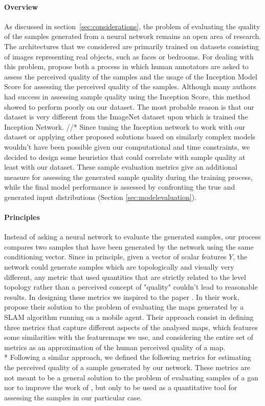\paragraph{Overview} As discussed in section~\ref{sec:considerations}, the problem of evaluating the quality of the samples generated from a neural network remains an open area of research. The architectures that we considered are primarily trained on datasets consisting of images representing real objects, such as faces or bedrooms. For dealing with this problem, \citeauthor{improved_gan} propose both a process in which human annotators are asked to assess the perceived quality of the samples \cite[p.~4]{improved_gan} and the usage of the Inception Model \cite{inception} Score for assessing the perceived quality of the samples. Although many authors had success in assessing sample quality using the Inception Score, this method showed to perform poorly on our dataset. The most probable reason is that our dataset is very different from the ImageNet dataset upon which is trained the Inception Network. //* Since tuning the Inception network to work with our dataset or applying other proposed solutions based on similarly complex models wouldn't have been possible given our computational and time constraints, we decided to design some heuristics that could correlate with sample quality at least with our dataset. These sample evaluation metrics give an additional measure for assessing the generated sample quality during the training process, while the final model performance is assessed by confronting the true and generated input distributions (Section \ref{sec:modelevaluation}).

\paragraph{Principles} Instead of asking a neural network to evaluate the generated samples, our process compares two samples that have been generated by the network using the same conditioning vector. Since in principle, given a vector of scalar features $Y$, the network could generate samples which are topologically and visually very different, any metric that used quantities that are strictly related to the level topology rather than a perceived concept of "quality" couldn't lead to reasonable results. In designing these metrics we inspired to the paper . In their work, \citeauthor{slam} propose their solution to the problem of evaluating the maps generated by a SLAM algorithm running on a mobile agent. Their approach consist in defining three metrics that capture different aspects of the analysed maps, which features some similarities with the \glspl{featuremap} we use, and considering the entire set of metrics as an approximation of the human perceived quality of a map. 
\\* Following a similar approach, we defined the following metrics for estimating the perceived quality of a sample generated by our network. These metrics are not meant to be a general solution to the problem of evaluating samples of a \gls{gan} nor to improve the work of \citeauthor{slam_metrics}, but only to be used as a quantitative tool for assessing the samples in our particular case.

